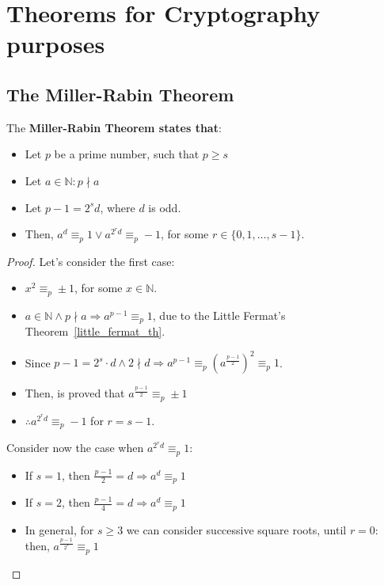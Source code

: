 \section{Theorems for Cryptography purposes}
\subsection{The Miller-Rabin Theorem}
\begin{theorem}
The \textbf{Miller-Rabin Theorem states that}:
\begin{itemize}
    \item Let $p$ be a prime number, such that $p \geq s$
    \item Let $a \in \mathbb{N}: p \nmid a$
    \item Let $p - 1 = 2^{s}d$, where $d$ is odd.
    \item Then, $a^{d} \equiv_{p} 1 \lor a^{2^{r}d} \equiv_{p} -1$, for some $r \in \{0, 1, \dots, s-1\}$.
\end{itemize}
\end{theorem}
\begin{proof}
    Let's consider the first case:
    \begin{itemize}
        \item $x^{2} \equiv_{p} \pm 1$, for some $x \in \mathbb{N}$.
        \item $a \in \mathbb{N} \land p \nmid a \Rightarrow a^{p-1} \equiv_{p} 1$, due to the Little Fermat's Theorem~\ref{little_fermat_th}.
        \item Since $p - 1 = 2^{s} \cdot d \land 2 \nmid d \Rightarrow a^{p-1} \equiv_{p} (a^{\frac{p-1}{2}})^{2} \equiv_{p} 1$.
        \item Then, is proved that $a^{\frac{p-1}{2}} \equiv_{p} \pm 1$
        \item $\therefore a^{2^{r}d} \equiv_{p} -1$ for $r = s - 1$.
    \end{itemize}
    Consider now the case when $a^{2^{r}d} \equiv_{p} 1$:
    \begin{itemize}
        \item If $s = 1$, then $\frac{p-1}{2} = d \Rightarrow a^{d} \equiv_{p} 1$
        \item If $s = 2$, then $\frac{p-1}{4} = d \Rightarrow a^{d} \equiv_{p} 1$
        \item In general, for $s \geq 3$ we can consider successive square roots, until $r = 0$: then, $a^{\frac{p-1}{2^s}} \equiv_{p} 1$
    \end{itemize}
\end{proof}

